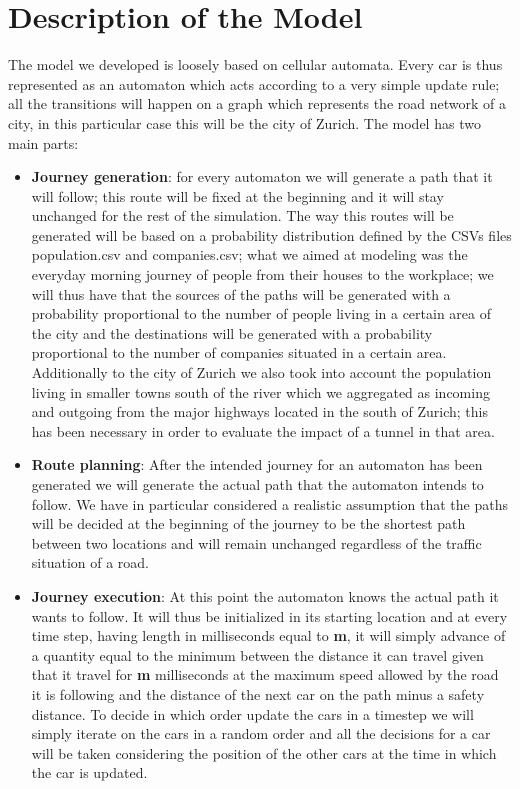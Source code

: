 \documentclass[11pt]{article}
\begin{document}
\section{Description of the Model}
The model we developed is loosely based on cellular automata. Every car is thus represented as an automaton which acts according to a very simple update rule; all the transitions will happen on a graph which represents the road network of a city, in this particular case this will be the city of Zurich. The model has two main parts:
\begin{itemize}
\item \textbf{Journey generation}: for every automaton we will generate a path that it will follow; this route will be fixed at the beginning and it will stay unchanged for the rest of the simulation. The way this routes will be generated will be based on a probability distribution defined by the CSVs files population.csv and companies.csv; what we aimed at modeling was the everyday morning journey of people from their houses to the workplace; we will thus have that the sources of the paths will be generated with a probability proportional to the number of people living in a certain area of the city and the destinations will be generated with a probability proportional to the number of companies situated in a certain area. Additionally to the city of Zurich we also took into account the population living in smaller towns south of the river which we aggregated as incoming and outgoing from the major highways located in the south of Zurich; this has been necessary in order to evaluate the impact of a tunnel in that area.
\item \textbf{Route planning}:  After the intended journey for an automaton has been generated we will generate the actual path that the automaton intends to follow. We have in particular considered a realistic assumption that the paths will be decided at the beginning of the journey to be the shortest path between two locations and will remain unchanged regardless of the traffic situation of a road.
\item \textbf{Journey execution}: At this point the automaton knows the actual path it wants to follow. It will thus be initialized in its starting location and at every time step, having length in milliseconds equal to \textbf{m}, it will simply advance of a quantity equal to the minimum between the distance it can travel given that it travel for \textbf{m} milliseconds at the maximum speed allowed by the road it is following and the distance of the next car on the path minus a safety distance. To decide in which order update the cars in a timestep we will simply iterate on the cars in a random order and all the decisions for a car will be taken considering the position of the other cars at the time in which the car is updated.
\end{itemize}
\end{document}
